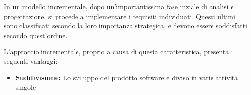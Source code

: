 In un modello incrementale, dopo un'importantissima fase inziale di analisi e progettazione, si procede
a implementare i requisiti individuati. Questi ultimi sono classificati secondo la loro importanza strategica,
e devono essere soddisfatti secondo quest'ordine.

L'approccio incrementale, proprio a causa di questa caratteristica, presenta i seguenti vantaggi:
\begin{itemize}
    \item \textbf{Suddivisione: } Lo sviluppo del prodotto software è diviso in varie attività singole
\end{itemize}